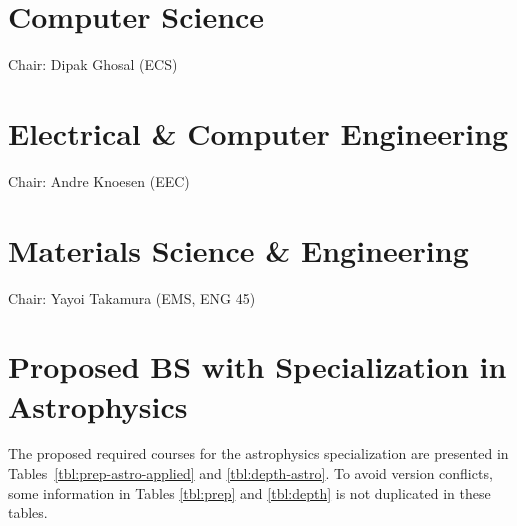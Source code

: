 \documentclass[12pt]{article}
\begin{document}
\section{Computer Science}
Chair: Dipak Ghosal (ECS)

\section{Electrical \& Computer Engineering}
Chair: Andre Knoesen (EEC)

\section{Materials Science \& Engineering}
Chair: Yayoi Takamura (EMS, ENG 45)














\section{Proposed BS with Specialization in Astrophysics}

The proposed required courses for the astrophysics specialization are presented in
Tables~\ref{tbl:prep-astro-applied} and \ref{tbl:depth-astro}.  To avoid
version conflicts, some information in Tables \ref{tbl:prep} and
\ref{tbl:depth} is not duplicated in these tables.
\end{document}
